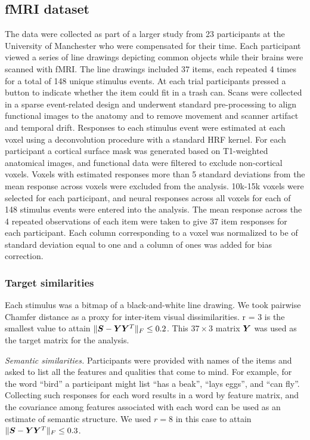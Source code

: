 \subsection{fMRI dataset} The data were collected as part of a larger study from
23 participants at the University of Manchester who were compensated for their
time. Each participant viewed a series of line drawings depicting common objects
while their brains were scanned with fMRI. The line drawings included 37 items,
each repeated 4 times for a total of 148 unique stimulus events. At each trial
participants pressed a button to indicate whether the item could fit in a trash
can.  Scans were collected in a sparse event-related design and underwent
standard pre-processing to align functional images to the anatomy and to remove
movement and scanner artifact and temporal drift. Responses to each stimulus
event were estimated at each voxel using a deconvolution procedure with a
standard HRF kernel. For each participant a cortical surface mask was generated
based on T1-weighted anatomical images, and functional data were filtered to
exclude non-cortical voxels. Voxels with estimated responses more than 5
standard deviations from the mean response across voxels were excluded from the
analysis. 10k-15k voxels were selected for each participant, and neural
responses across all voxels for each of 148 stimulus events were entered into
the analysis. The mean response across the 4 repeated observations of each item
were taken to give 37 item responses for each participant. Each column
corresponding to a voxel was normalized to be of standard deviation equal to one
and a column of ones was added for bias correction.

\subsubsection*{Target similarities}
\ifdefined\SEMANTIC
\fi%
 Each stimulus was a bitmap of a black-and-white line drawing. We took pairwise
 Chamfer distance as a proxy for inter-item visual dissimilarities. r = 3 is the
 smallest value to attain $\|\boldsymbol{S} - \boldsymbol{Y}\boldsymbol{Y}^T\|_F \leq 0.2$.  This $37 \times 3$
 matrix $\boldsymbol{Y}$ was used as the target matrix for the analysis.

\ifdefined\SEMANTIC
\textit{Semantic similarities.}
Participants were provided with names of the items and asked to list all the
features and qualities that come to mind. For example, for the word ``bird'' a
participant might list ``has a beak'', ``lays eggs'', and ``can fly''.
Collecting such responses for each word results in a word by feature matrix, and
the covariance among features associated with each word can be used as an
estimate of semantic structure. We used $r = 8$ in this case to attain $\|\boldsymbol{S} -
\boldsymbol{Y}\boldsymbol{Y}^T\|_F \leq 0.3$.
\fi%

